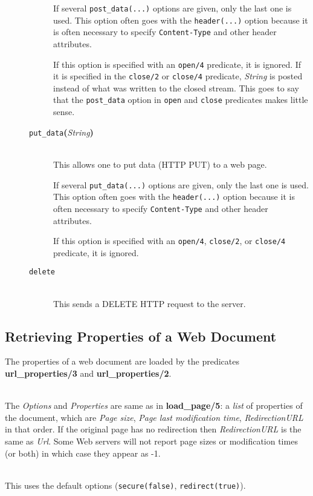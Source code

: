 \begin{description}
\begin{description}
    If several \texttt{post\_data(...)} options are given, only the last one is
    used. This option often goes with the \texttt{header(...)} option because it
    is often necessary to specify \texttt{Content-Type} and other header
    attributes.  

    If this option is specified with an \texttt{open/4} predicate, it is
    ignored.  If it is specified in the \texttt{close/2} or 
    \texttt{close/4}   predicate, \emph{String} is posted instead of what was
    written to the closed stream. This goes to say that the \texttt{post\_data}
    option in \texttt{open} and \texttt{close} predicates makes little sense. 
    \item[{\tt put\_data}{\bf (}{\it String}{\bf )}]\mbox{}\\
    This allows one to put data (HTTP PUT) to a web page.

    If several \texttt{put\_data(...)} options are given, only the last one is
    used. This option often goes with the \texttt{header(...)} option because it
    is often necessary to specify \texttt{Content-Type} and other header
    attributes.  

    If this option is specified with an \texttt{open/4},
    \texttt{close/2}, or \texttt{close/4} predicate, it is
    ignored.
  \item[\tt delete] \mbox{} \\
    This sends a DELETE HTTP request to the server.
  \end{description}

\end{description}

\subsection{Retrieving Properties of a Web Document}

The properties of a web document are loaded by the predicates {\bf
  url\_properties/3} and {\bf url\_properties/2}. 

\begin{description}
\item[url\_properties({\it +Url, +Options, -Properties})]\mbox{}
  \\
  The {\it Options} and {\it Properties} are same as in {\bf load\_page/5}:
  a \emph{list} of properties of the document, which
  are {\it Page size}, {\it Page last modification time}, \emph{RedirectionURL} 
  in that order. If the original page has no redirection then
  \emph{RedirectionURL} is the same as \emph{Url}. 
  Some Web servers will not report page sizes or modification times (or
  both) in which case they appear as -1.
\item[url\_properties({\it +Url, -Properties})]\mbox{}
  \\
  This uses the default options (\texttt{secure(false)}, \texttt{redirect(true)}). 

\end{description}

